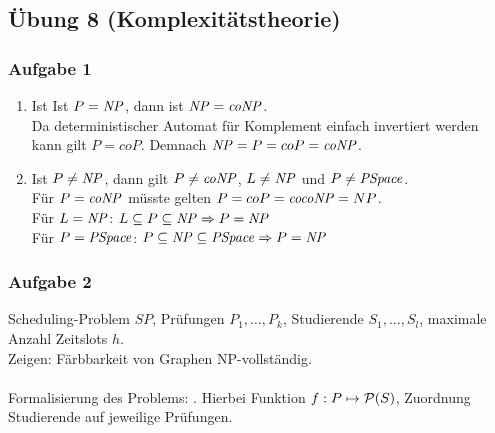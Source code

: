 \subsection*{Übung 8 (Komplexitätstheorie)}
\subsubsection*{Aufgabe 1}
    \begin{enumerate}
        \item Ist Ist $P = \mathit{NP}$, dann ist $\mathit{NP} = \mathit{coNP}$. \\
            \LOES Da deterministischer Automat für Komplement einfach invertiert werden kann gilt $P = coP$. Demnach $\mathit{NP} = P = coP = \mathit{coNP}$.

        \item Ist $P \neq \mathit{NP}$, dann gilt $P \neq \mathit{coNP}$, $L \neq \mathit{NP}$ und $P \neq \mathit{PSpace}$. \\
            \LOES Für $P = \mathit{coNP}$ müsste gelten $P = coP = \mathit{cocoNP} = NP$. \\
            Für $L = \mathit{NP}$: $L \subseteq P \subseteq \mathit{NP} \Rightarrow P = \mathit{NP}$ \\
            Für $P = \mathit{PSpace}$: $P \subseteq \mathit{NP} \subseteq \mathit{PSpace} \Rightarrow P = \mathit{NP}$
    \end{enumerate}


\subsubsection*{Aufgabe 2}

    Scheduling-Problem $SP$, Prüfungen $P_{1}, \dots, P_{k}$, Studierende $S_{1}, \dots, S_{l}$, maximale Anzahl Zeitslots $h$. \\
    Zeigen: Färbbarkeit von Graphen NP-vollständig. \\

    \LOES \\
    Formalisierung des Problems: . Hierbei Funktion $f: P \mapsto \mathcal{P}(S)$, Zuordnung Studierende auf jeweilige Prüfungen.

